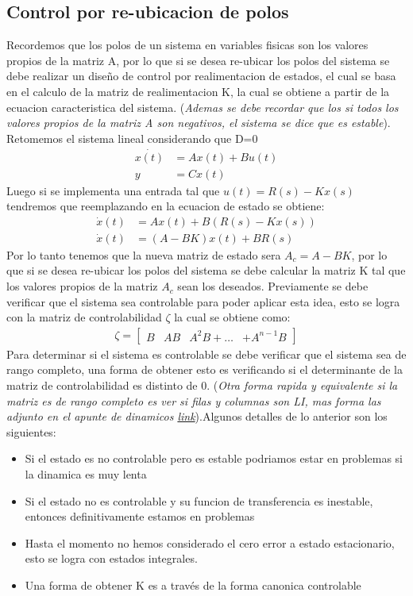 \documentclass[
  11pt,
  letterpaper,
   addpoints,
   answers
  ]{exam}
\begin{document}
\subsection{Control por re-ubicacion de polos}
Recordemos que los polos de un sistema en variables fisicas son los valores propios de la matriz A, por lo que si se desea re-ubicar los polos del sistema se debe realizar un diseño de control por realimentacion de estados, el cual se basa en el calculo de la matriz de realimentacion K, la cual se obtiene a partir de la ecuacion caracteristica del sistema. (\textit{Ademas se debe recordar que los si todos los valores propios de la matriz A son negativos, el sistema se dice que es estable}). Retomemos el sistema lineal considerando que D=0
\begin{align}
    \dot{x(t)} &= Ax(t) + Bu(t) \\
    y &= Cx(t)
\end{align}
Luego si se implementa una entrada tal que $u(t) = R(s) -Kx(s)$ tendremos que reemplazando en la ecuacion de estado se obtiene:
\begin{align}
    \dot{x}(t) &= Ax(t) + B(R(s) - Kx(s))\\
    \dot{x}(t) &= (A - BK)x(t) + BR(s)
\end{align}
Por lo tanto tenemos que la nueva matriz de estado sera $A_{c} = A - BK$, por lo que si se desea re-ubicar los polos del sistema se debe calcular la matriz K tal que los valores propios de la matriz $A_{c}$ sean los deseados. Previamente se debe verificar que el sistema sea controlable para poder aplicar esta idea, esto se logra con la matriz de controlabilidad $\zeta$ la cual se obtiene como:
\begin{align}
    \zeta =
    \begin{bmatrix}
         B & AB & A^{2}B + \dots & + A^{n-1}B
    \end{bmatrix}
\end{align}
Para determinar si el sistema es controlable se debe verificar que el sistema sea de rango completo, una forma de obtener esto es verificando si el determinante de la matriz de controlabilidad es distinto de 0. (\textit{Otra forma rapida y equivalente si la matriz es de rango completo es ver si filas y columnas son LI, mas forma las adjunto en el apunte de dinamicos \href{https://www.u-cursos.cl/ingenieria/2024/1/EL3204/1/material_docente/detalle?id=7719473}{link}}).Algunos detalles de lo anterior son los siguientes:
\begin{itemize}
    \item Si el estado es no controlable pero es estable podriamos estar en problemas si la dinamica es muy lenta
    \item Si el estado no es controlable y su funcion de transferencia es inestable, entonces definitivamente estamos en problemas
    \item Hasta el momento no hemos considerado el cero error a estado estacionario, esto se logra con estados integrales.
    \item Una forma de obtener K es a través de la forma canonica controlable
\end{itemize}
\end{document}
